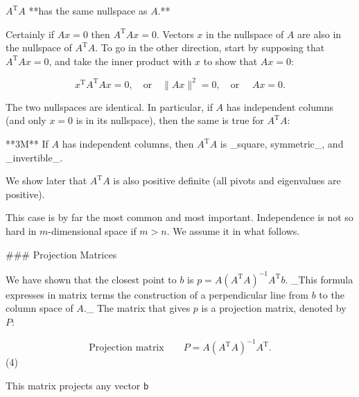 \(A^{\mathrm{T}}A\) **has the same nullspace as \(A\).**

Certainly if \(Ax=0\) then \(A^{\mathrm{T}}Ax=0\). Vectors \(x\) in the nullspace of \(A\) are also in the nullspace of \(A^{\mathrm{T}}A\). To go in the other direction, start by supposing that \(A^{\mathrm{T}}Ax=0\), and take the inner product with \(x\) to show that \(Ax=0\):

\[x^{\mathrm{T}}A^{\mathrm{T}}Ax=0,\quad\text{or}\quad\|Ax\|^{2}=0,\quad\text{or }\quad Ax=0.\]

The two nullspaces are identical. In particular, if \(A\) has independent columns (and only \(x=0\) is in its nullspace), then the same is true for \(A^{\mathrm{T}}A\):

**3M** If \(A\) has independent columns, then \(A^{\mathrm{T}}A\) is _square, symmetric_, and _invertible_.

We show later that \(A^{\mathrm{T}}A\) is also positive definite (all pivots and eigenvalues are positive).

This case is by far the most common and most important. Independence is not so hard in \(m\)-dimensional space if \(m>n\). We assume it in what follows.

### Projection Matrices

We have shown that the closest point to \(b\) is \(p=A(A^{\mathrm{T}}A)^{-1}A^{\mathrm{T}}b\). _This formula expresses in matrix terms the construction of a perpendicular line from \(b\) to the column space of \(A\)._ The matrix that gives \(p\) is a projection matrix, denoted by \(P\):

\[\text{{Projection matrix}}\qquad P=A(A^{\mathrm{T}}A)^{-1}A^{\mathrm{T}}.\] (4)

This matrix projects any vector \(\mathsf{b}\) 